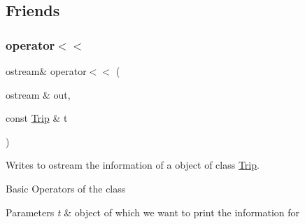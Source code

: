 \subsection{Friends}
\mbox{\label{group___trip_gaeae00f4e739b064d8261c91d62cde34a}} 
\subsubsection{\texorpdfstring{operator$<$$<$}{operator<<}}
{\footnotesize\ttfamily ostream\& operator$<$$<$ (\begin{DoxyParamCaption}\item[{ostream \&}]{out,  }\item[{const \hyperlink{class_trip}{Trip} \&}]{t }\end{DoxyParamCaption})\hspace{0.3cm}{\ttfamily [friend]}}



Writes to ostream the information of a object of class \hyperlink{class_trip}{Trip}. 

Basic Operators of the class 
\begin{DoxyParams}{Parameters}
{\em t} & object of which we want to print the information for \\
\hline
\end{DoxyParams}
